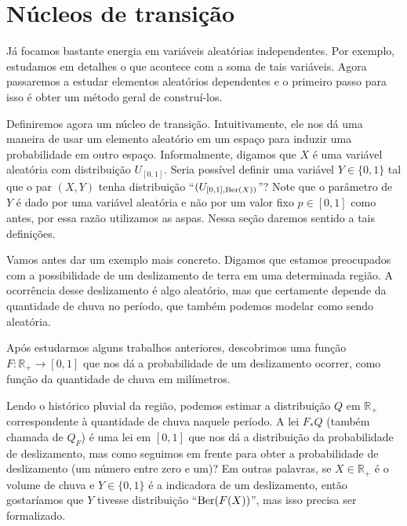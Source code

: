 



\section{Núcleos de transição}

Já focamos bastante energia em variáveis aleatórias independentes.
Por exemplo, estudamos em detalhes o que acontece com a soma de tais variáveis.
Agora passaremos a estudar elementos aleatórios dependentes e o primeiro passo para isso é obter um método geral de construí-los.

Definiremos agora um núcleo de transição.
Intuitivamente, ele nos dá uma maneira de usar um elemento aleatório em um espaço para induzir uma probabilidade em outro espaço.
Informalmente, digamos que $X$ é uma variável aleatória com distribuição $U_{[0, 1]}$.
Seria possível definir uma variável $Y \in \{0, 1\}$ tal que o par $(X, Y)$ tenha distribuição ``$(U_{[0, 1], \operatorname{Ber}(X))}$''?
Note que o parâmetro de $Y$ é dado por uma variável aleatória e não por um valor fixo $p \in [0, 1]$ como antes, por essa razão utilizamos as aspas.
Nessa seção daremos sentido a tais definições.

Vamos antes dar um exemplo mais concreto.
Digamos que estamos preocupados com a possibilidade de um deslizamento de terra em uma determinada região.
A ocorrência desse deslizamento é algo aleatório, mas que certamente depende da quantidade de chuva no período, que também podemos modelar como sendo aleatória.

Após estudarmos alguns trabalhos anteriores, descobrimos uma função $F:\mathbb{R}_+ \to [0,1]$ que nos dá a probabilidade de um deslizamento ocorrer, como função da quantidade de chuva em milímetros.

Lendo o histórico pluvial da região, podemos estimar a distribuição $Q$ em $\mathbb{R}_+$ correspondente à quantidade de chuva naquele período.
A lei $F_* Q$ (também chamada de $Q_F$) é uma lei em $[0,1]$ que nos dá a distribuição da probabilidade de deslizamento, mas como seguimos em frente para obter a probabilidade de deslizamento (um número entre zero e um)?
Em outras palavras, se $X \in \mathbb{R}_+$ é o volume de chuva e $Y \in \{0, 1\}$ é a indicadora de um deslizamento, então gostaríamos que $Y$ tivesse distribuição ``$\operatorname{Ber}(F(X))$'', mas isso precisa ser formalizado.

